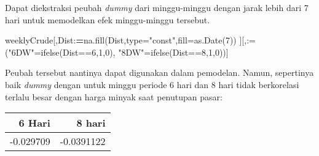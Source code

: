 \documentclass[
]{book}
\newenvironment{Shaded}{\begin{snugshade}}{\end{snugshade}}
\newcommand{\AttributeTok}[1]{\textcolor[rgb]{0.77,0.63,0.00}{#1}}
\newcommand{\DecValTok}[1]{\textcolor[rgb]{0.00,0.00,0.81}{#1}}
\newcommand{\ErrorTok}[1]{\textcolor[rgb]{0.64,0.00,0.00}{\textbf{#1}}}
\newcommand{\FunctionTok}[1]{\textcolor[rgb]{0.00,0.00,0.00}{#1}}
\newcommand{\NormalTok}[1]{#1}
\newcommand{\OtherTok}[1]{\textcolor[rgb]{0.56,0.35,0.01}{#1}}
\newcommand{\SpecialCharTok}[1]{\textcolor[rgb]{0.00,0.00,0.00}{#1}}
\newcommand{\StringTok}[1]{\textcolor[rgb]{0.31,0.60,0.02}{#1}}
\begin{document}
Dapat diekstraksi peubah \emph{dummy} dari minggu-minggu dengan jarak lebih dari 7 hari untuk memodelkan efek minggu-minggu tersebut.

\begin{Shaded}
\begin{Highlighting}[]
\NormalTok{weeklyCrude[,Dist}\SpecialCharTok{:}\ErrorTok{=}\FunctionTok{na.fill}\NormalTok{(Dist,}\AttributeTok{type=}\StringTok{"const"}\NormalTok{,}\AttributeTok{fill=}\FunctionTok{as.Date}\NormalTok{(}\DecValTok{7}\NormalTok{))}
\NormalTok{         ][,}\StringTok{\textasciigrave{}}\AttributeTok{:=}\StringTok{\textasciigrave{}}\NormalTok{(}\StringTok{"6DW"}\OtherTok{=}\FunctionTok{ifelse}\NormalTok{(Dist}\SpecialCharTok{==}\DecValTok{6}\NormalTok{,}\DecValTok{1}\NormalTok{,}\DecValTok{0}\NormalTok{),}
               \StringTok{"8DW"}\OtherTok{=}\FunctionTok{ifelse}\NormalTok{(Dist}\SpecialCharTok{==}\DecValTok{8}\NormalTok{,}\DecValTok{1}\NormalTok{,}\DecValTok{0}\NormalTok{))]}
\end{Highlighting}
\end{Shaded}

Peubah tersebut nantinya dapat digunakan dalam pemodelan. Namun, sepertinya baik \emph{dummy} dengan untuk minggu periode 6 hari dan 8 hari tidak berkorelasi terlalu besar dengan harga minyak saat penutupan pasar:

\begin{Shaded}
\end{Shaded}

\begin{tabular}{r|r}
\hline
6 Hari & 8 hari\\
\hline
-0.029709 & -0.0391122\\
\hline
\end{tabular}
\end{document}
